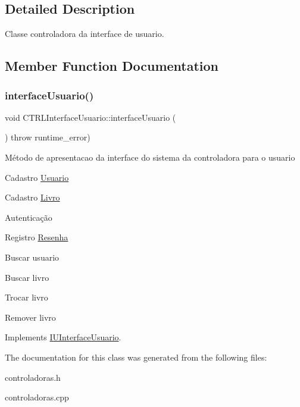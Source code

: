 \subsection{Detailed Description}
Classe controladora da interface de usuario. 

\subsection{Member Function Documentation}
\mbox{\label{classCTRLInterfaceUsuario_a733e0feb4a9391c04b96bd0d7efb2ebc}} 
\subsubsection{\texorpdfstring{interface\+Usuario()}{interfaceUsuario()}}
{\footnotesize\ttfamily void C\+T\+R\+L\+Interface\+Usuario\+::interface\+Usuario (\begin{DoxyParamCaption}{ }\end{DoxyParamCaption}) throw  runtime\+\_\+error) \hspace{0.3cm}{\ttfamily [virtual]}}

Método de apresentacao da interface do sistema da controladora para o usuario

Cadastro \hyperlink{classUsuario}{Usuario}

Cadastro \hyperlink{classLivro}{Livro}

Autenticação

Registro \hyperlink{classResenha}{Resenha}

Buscar usuario

Buscar livro

Trocar livro

Remover livro 

Implements \hyperlink{classIUInterfaceUsuario}{I\+U\+Interface\+Usuario}.



The documentation for this class was generated from the following files\+:\begin{DoxyCompactItemize}
\item 
controladoras.\+h\item 
controladoras.\+cpp\end{DoxyCompactItemize}
